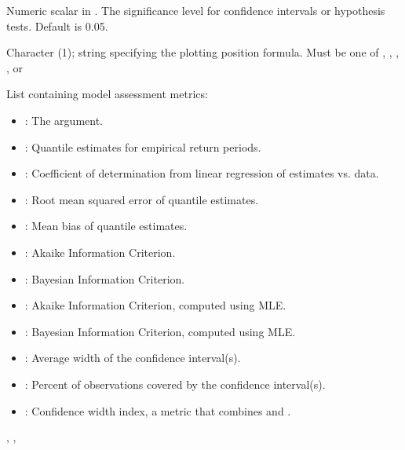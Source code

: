 \documentclass[a4paper]{book}
\begin{document}
\begin{Arguments}
\begin{ldescription}
\begin{itemize}
\end{itemize}


\item[\code{alpha}] Numeric scalar in \eqn{[0.01, 0.1]}{}. The significance
level for confidence intervals or hypothesis tests. Default is 0.05.

\item[\code{pp\_formula}] Character (1); string specifying the plotting position formula.
Must be one of , , , , or 
\end{ldescription}
\end{Arguments}
%
\begin{Value}
List containing model assessment metrics:
\begin{itemize}

\item{} : The  argument.
\item{} : Quantile estimates for empirical return periods.
\item{} : Coefficient of determination from linear regression of estimates vs. data.
\item{} : Root mean squared error of quantile estimates.
\item{} : Mean bias of quantile estimates.
\item{} : Akaike Information Criterion.
\item{} : Bayesian Information Criterion.
\item{} : Akaike Information Criterion, computed using MLE.
\item{} : Bayesian Information Criterion, computed using MLE.
\item{} : Average width of the confidence interval(s).
\item{} : Percent of observations covered by the confidence interval(s).
\item{} : Confidence width index, a metric that combines  and .

\end{itemize}

\end{Value}
%
\begin{SeeAlso}
, , 
\end{SeeAlso}
\end{document}
